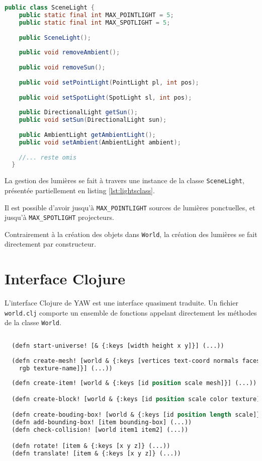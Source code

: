 \documentclass{report}
\begin{document}
\begin{lstlisting}[caption=Interface incomplète de la classe SceneLight, label={lst:lightsclass},language=Java]
  public class SceneLight {
    public static final int MAX_POINTLIGHT = 5;
    public static final int MAX_SPOTLIGHT = 5;
 
    public SceneLight();
     
    public void removeAmbient();
    
    public void removeSun();
   
    public void setPointLight(PointLight pl, int pos);
    
    public void setSpotLight(SpotLight sl, int pos);
 
    public DirectionalLight getSun();
    public void setSun(DirectionalLight sun);
    
    public AmbientLight getAmbientLight();
    public void setAmbient(AmbientLight ambient);
   
    //... reste omis
  }
\end{lstlisting}

La gestion des lumières se fait à travers une instance de la classe
\lstinline|SceneLight|, présentée partiellement en listing
\ref{lst:lightsclass}.

Il est possible d'avoir jusqu'à \lstinline|MAX_POINTLIGHT| sources de lumières
ponctuelles, et jusqu'à \lstinline|MAX_SPOTLIGHT| projecteurs.

Contrairement à la création des objets dans \lstinline|World|, la création des lumières se
fait directement par constructeur.

\section{Interface Clojure}

L'interface Clojure de YAW est une interface quasiment traduite. Un fichier
\texttt{world.clj} comporte un ensemble de fonctions appelant directement les
méthodes de la classe \lstinline|World|.

\begin{lstlisting}[caption=Interface initiale simplifiée de \texttt{world.clj},label={lst:worldclj},language=Lisp]
  
  (defn start-universe! [& {:keys [width height x y]}] (...))
  
  (defn create-mesh! [world & {:keys [vertices text-coord normals faces weight
    rgb texture-name]}] (...))
  
  (defn create-item! [world & {:keys [id position scale mesh]}] (...))

  (defn create-block! [world & {:keys [id position scale color texture]}] (...))

  (defn create-bouding-box! [world & {:keys [id position length scale]}] (...))
  (defn add-bounding-box! [item bounding-box] (...))
  (defn check-collision! [world item1 item2] (...))

  (defn rotate! [item & {:keys [x y z]} (...))
  (defn translate! [item & {:keys [x y z]} (...))
  
\end{lstlisting}
\end{document}
